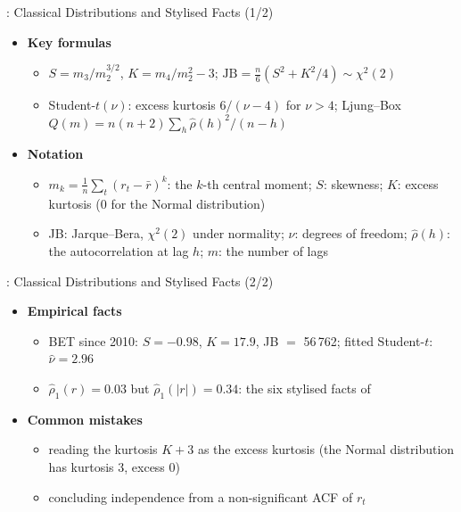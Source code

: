 \begin{frame}{: Classical Distributions and Stylised Facts (1/2)}
\itemsize{\small}
\begin{itemize}
    \item \textbf{Key formulas}
    \begin{itemize}
        \item $S = m_3/m_2^{3/2}$, $K = m_4/m_2^2 - 3$; $\text{JB} = \frac{n}{6}(S^2 + K^2/4) \sim \chi^2(2)$ 
        \item Student-$t(\nu)$: excess kurtosis $6/(\nu - 4)$ for $\nu > 4$; Ljung--Box $Q(m) = n(n+2)\sum_h \hat\rho(h)^2/(n - h)$
    \end{itemize}
    \item \textbf{Notation}
    \begin{itemize}
        \item $m_k = \frac1n\sum_t (r_t - \bar r)^k$: the $k$-th central moment; $S$: skewness; $K$: excess kurtosis (0 for the Normal distribution)
        \item JB: Jarque--Bera, $\chi^2(2)$ under normality; $\nu$: degrees of freedom; $\hat\rho(h)$: the autocorrelation at lag $h$; $m$: the number of lags
    \end{itemize}
\end{itemize}
\end{frame}

\begin{frame}{: Classical Distributions and Stylised Facts (2/2)}
\itemsize{\small}
\begin{itemize}
    \item \textbf{Empirical facts}
    \begin{itemize}
        \item BET since 2010: $S = -0.98$, $K = 17.9$, JB $=$ 56\,762; fitted Student-$t$: $\hat\nu = 2.96$
        \item $\hat\rho_1(r) = 0.03$ but $\hat\rho_1(|r|) = 0.34$: the six stylised facts of 
    \end{itemize}
    \item \textbf{Common mistakes}
    \begin{itemize}
        \item reading the kurtosis $K + 3$ as the excess kurtosis (the Normal distribution has kurtosis 3, excess 0)
        \item concluding independence from a non-significant ACF of $r_t$
    \end{itemize}
\end{itemize}
\end{frame}

